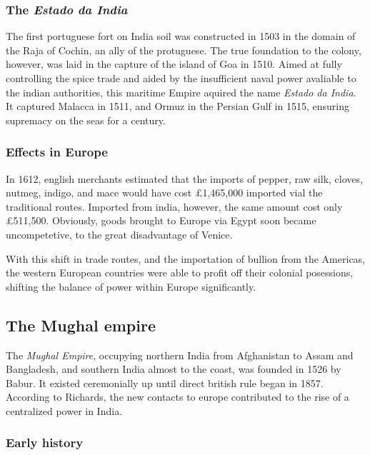 \documentclass[11pt, a4paper, headings=standardclasses]{scrartcl}
\begin{document}
\subsubsection{The \textit{Estado da India}}

The first portuguese fort on India soil was constructed in 1503 in the domain of the Raja of Cochin, an ally of the protuguese.\autocite[383]{FT} The true foundation to the colony, however, was laid in the capture of the island of Goa in 1510. Aimed at fully controlling the spice trade and aided by the insufficient naval power avaliable to the indian authorities, this maritime Empire aquired the name \textit{Estado da India}. It captured Malacca in 1511, and Ormuz in the Persian Gulf in 1515, ensuring supremacy on the seas for a century.\autocite[382--383]{FT}

\subsubsection{Effects in Europe}

In 1612, english merchants estimated that the imports of pepper, raw silk, cloves, nutmeg, indigo, and mace would have cost \pounds{}1,465,000 imported vial the traditional routes. Imported from india, however, the same amount cost only \pounds{}511,500.\autocite[393]{RF} Obviously, goods brought to Europe via Egypt soon became uncompetetive, to the great disadvantage of Venice.

With this shift in trade routes, and the importation of bullion from the Americas, the western European countries were able to profit off their colonial posessions, shifting the balance of power within Europe significantly.\autocite{EIC}

\subsection{The Mughal empire}

The \emph{Mughal Empire}, occupying northern India from Afghanistan to Assam and Bangladesh, and southern India almost to the coast, was founded in 1526 by Babur. It existed ceremonially up until direct british rule began in 1857.
According to Richards, the new contacts to europe contributed to the rise of a centralized power in India.\autocite[6]{richards}
\subsubsection{Early history}
\end{document}
